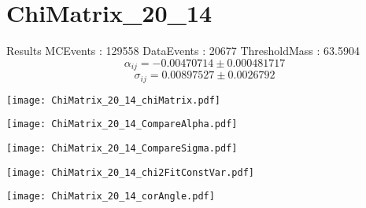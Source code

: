 \documentclass[a4paper,12pt]{article}
\begin{document}
\section{ChiMatrix\_20\_14}
\begin{minipage}{0.49\linewidth} Results \newline
MCEvents : 129558\newline
DataEvents : 20677 \newline
ThresholdMass : 63.5904\\
$$\alpha_{ij} = -0.00470714\pm 0.000481717$$
$$\sigma_{ij} = 0.00897527\pm 0.0026792$$
\end{minipage}\hfill
\begin{minipage}{0.49\linewidth} 
\texttt{[image: ChiMatrix\_20\_14\_chiMatrix.pdf]}\\
\end{minipage}
\hfill
\begin{minipage}{0.49\linewidth} 
\texttt{[image: ChiMatrix\_20\_14\_CompareAlpha.pdf]}\\
\end{minipage}
\hfill
\begin{minipage}{0.49\linewidth} 
\texttt{[image: ChiMatrix\_20\_14\_CompareSigma.pdf]}\\
\end{minipage}
\begin{minipage}{0.49\linewidth} 
\texttt{[image: ChiMatrix\_20\_14\_chi2FitConstVar.pdf]}\\
\end{minipage}
\hfill
\begin{minipage}{0.49\linewidth} 
\texttt{[image: ChiMatrix\_20\_14\_corAngle.pdf]}\\
\end{minipage}
\end{document}
